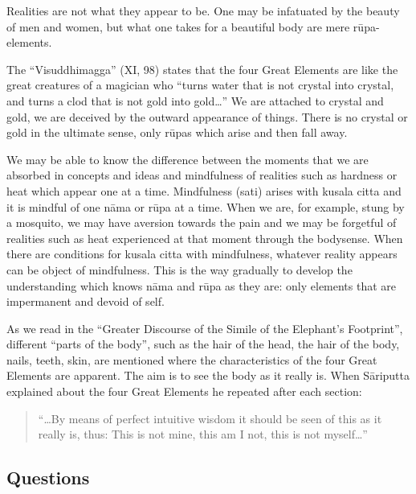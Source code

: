 \documentclass{book}
\begin{document}
Realities are not what they appear to be. One may be infatuated by the
beauty of men and women, but what one takes for a beautiful body are
mere r\=upa-elements.

The ``Visuddhimagga'' (XI, 98) states that the four Great Elements are
like the great creatures of a magician who ``turns water that is not
crystal into crystal, and turns a clod that is not gold into gold\ldots''
We are attached to crystal and gold, we are deceived by the outward
appearance of things. There is no crystal or gold in the ultimate
sense, only r\=upas which arise and then fall away.

We may be able to know the difference between the moments that we are
absorbed in concepts and ideas and mindfulness of realities such as
hardness or heat which appear one at a time. Mindfulness (sati) arises
with kusala citta and it is mindful of one n{\=a}ma or r\=upa at a
time. When we are, for example, stung by a mosquito, we may have
aversion towards the pain and we may be forgetful of realities such as
heat experienced at that moment through the bodysense. When there are
conditions for kusala citta with mindfulness, whatever reality appears
can be object of mindfulness. This is the way gradually to develop the
understanding which knows n{\=a}ma and r\=upa as they are: only
elements that are impermanent and devoid of self.

As we read in the ``Greater Discourse of the Simile of the Elephant's
Footprint'', different ``parts of the body'', such as  the hair of the head, the hair of 
the body, nails, teeth, skin, are mentioned where the
characteristics of the four Great Elements are apparent. The aim is to
see the body as it really is. When S{\=a}riputta explained about the
four Great Elements he repeated after each section:




\begin{quote}\begin{flushleft}
``\ldots By means of perfect intuitive wisdom it should be seen of this as
it really is, thus: This is not mine, this am I not, this is not
myself\ldots''
\end{flushleft}\end{quote}








\subsection*{Questions}
\end{document}
